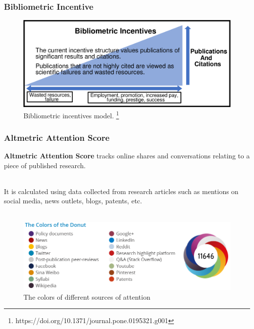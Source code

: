 \documentclass{beamer}
\begin{document}
\begin{frame}

    \frametitle{Bibliometric Incentive}

    \begin{figure}[h]
        \includegraphics[height=0.5\textheight]{1.png}
         \caption{Bibliometric incentives model. \footnote{https://doi.org/10.1371/journal.pone.0195321.g001}}
    \end{figure}

\end{frame}
\begin{frame}
    \frametitle{Altmetric Attention Score}

    \textbf{Altmetric Attention Score} tracks online shares and conversations relating to a piece of published research. \\~\

    It is calculated using data collected from research articles such as mentions
    on social media, news outlets, blogs, patents, etc.\\~\

    \begin{figure}[h]
        \includegraphics[height=0.41\textheight]{2.png}
        \caption{The colors of different sources of attention}
    \end{figure}
\end{frame}
\end{document}
